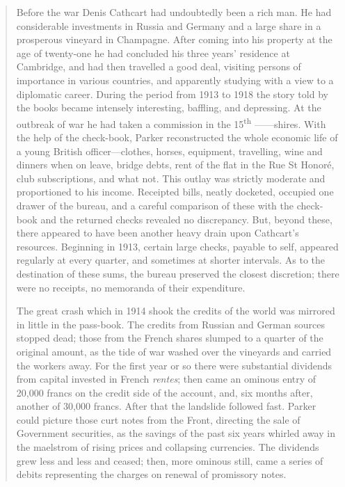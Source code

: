 \begin{quotation}
Before the war Denis Cathcart had undoubtedly been a rich man. He had considerable investments in Russia and Germany and a large share in a prosperous vineyard in Champagne. After coming into his property at the age of twenty-one he had concluded his three years' residence at Cambridge, and had then travelled a good deal, visiting persons of importance in various countries, and apparently studying with a view to a diplomatic career. During the period from 1913 to 1918 the story told by the books became intensely interesting, baffling, and depressing. At the outbreak of war he had taken a commission in the 15\textsuperscript{th} ——shires.  With the help of the check-book, Parker reconstructed the whole economic life of a young British officer—clothes, horses, equipment, travelling, wine and dinners when on leave, bridge debts, rent of the flat in the Rue St Honoré, club subscriptions, and what not. This outlay was strictly moderate and proportioned to his income. Receipted bills, neatly docketed, occupied one drawer of the bureau, and a careful comparison of these with the check-book and the returned checks revealed no discrepancy. But, beyond these, there appeared to have been another heavy drain upon Cathcart's resources. Beginning in 1913, certain large checks, payable to self, appeared regularly at every quarter, and sometimes at shorter intervals. As to the destination of these sums, the bureau preserved the closest discretion; there were no receipts, no memoranda of their expenditure.

The great crash which in 1914 shook the credits of the world was mirrored in little in the pass-book. The credits from Russian and German sources stopped dead; those from the French shares slumped to a quarter of the original amount, as the tide of war washed over the vineyards and carried the workers away. For the first year or so there were substantial dividends from capital invested in French \textit{rentes}; then came an ominous entry of 20,000 francs on the credit side of the account, and, six months after, another of 30,000 francs. After that the landslide followed fast. Parker could picture those curt notes from the Front, directing the sale of Government securities, as the savings of the past six years whirled away in the maelstrom of rising prices and collapsing currencies. The dividends grew less and less and ceased; then, more ominous still, came a series of debits representing the charges on renewal of promissory notes.


\end{quotation}

